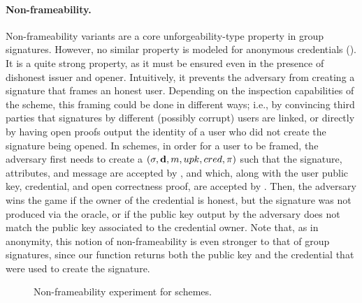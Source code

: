 \paragraph{Non-frameability.} %
Non-frameability variants are a core unforgeability-type property in group
signatures. However, no
similar property is modeled for anonymous credentials (). It is a quite strong
property, as it must be ensured even in the presence of dishonest issuer and
opener. Intuitively, it prevents the adversary from creating a signature that
frames an honest user. Depending on the inspection capabilities of the scheme,
this framing could be done in different ways; i.e., by convincing third parties
that signatures by different (possibly corrupt) users are linked, or directly
by having open proofs output the identity of a user who did not create the
signature being opened.
%
In \GSAC schemes, in order for a user to be framed, the adversary first needs to
create a $(\sigma,\mathbf{d},m,upk,cred,\pi)$ such that the signature,
attributes, and message are accepted by \Verify, and which, along with the user
public key, credential, and open correctness proof, are accepted by \Judge.
Then, the adversary wins the game if the owner of the credential is honest, but
the signature was not produced via the \SIGN oracle, or if the public key output
by the adversary does not match the public key associated to the credential
owner.
%
Note that, as in anonymity, this notion of non-frameability is even stronger
to that of group signatures, since our \Open function returns both the public
key and the credential that were used to create the signature.

\begin{figure}[htp!]
  \caption{Non-frameability experiment for \GSAC schemes.}
  \label{fig:exp-gsac-frame}
\end{figure}

